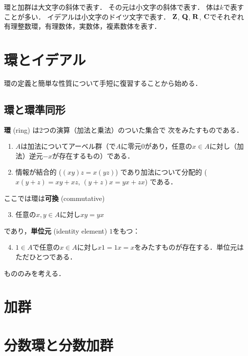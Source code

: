 環と加群は大文字の斜体で表す．
その元は小文字の斜体で表す．
体は\(k\)で表すことが多い．
イデアルは小文字のドイツ文字で表す．
\(\mathbf{Z}\), \(\mathbf{Q}\), \(\mathbf{R}\), \(\mathbf{C}\)でそれぞれ
有理整数環，有理数体，実数体，複素数体を表す．





\chapter{環とイデアル}

環の定義と簡単な性質について手短に復習することから始める．

\section*{環と環準同形}
\textbf{環} (ring) は2つの演算（加法と乗法）のついた集合で
次をみたすものである．
\begin{enumerate}[1)]
    \item \(A\)は加法についてアーベル群（で\(A\)に零元\(0\)があり，任意の\(x\in A\)に対し（加法）逆元\(-x\)が存在するもの）である．
    \item 情報が結合的 (\((xy)z=x(yz)\)) であり加法について分配的 (\(x(y+z)=xy+xz\), \((y+z)x=yx+zx\)) である．
\end{enumerate}
ここでは環は\textbf{可換} (commutative) 
\begin{enumerate}[1)]\setcounter{enumi}{2}
    \item 任意の\(x,y\in A\)に対し\(xy=yx\)
\end{enumerate}
であり，\textbf{単位元} (identity element) \(1\)をもつ：
\begin{enumerate}[1)]\setcounter{enumi}{3}
    \item \(1\in A\)で任意の\(x\in A\)に対し\(x1=1x=x\)をみたすものが存在する．単位元はただひとつである．
\end{enumerate}
もののみを考える．

\chapter{加群}
\chapter{分数環と分数加群}
